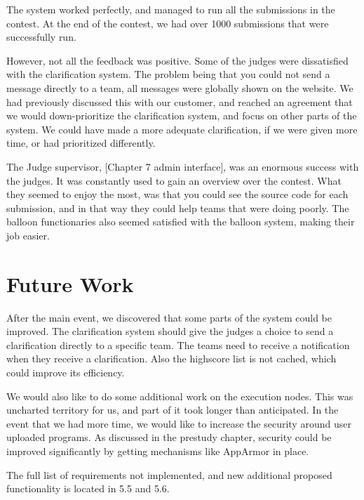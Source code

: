 The system worked perfectly, and managed to run all the submissions in
the contest. At the end of the contest, we had over 1000 submissions
that were successfully run. 

However, not all the feedback was positive. Some of the judges were
dissatisfied with the clarification system. The problem being that you
could not send a message directly to a team, all messages were globally
shown on the website. We had previously discussed this with our
customer, and reached an agreement that we would down-prioritize the
clarification system, and focus on other parts of the system. We could
have made a more adequate clarification, if we were given more time, or
had prioritized differently. 

The Judge supervisor, [Chapter 7 admin interface], was an enormous
success with the judges. It was constantly used to gain an overview
over the contest. What they seemed to enjoy the most, was that you
could see the source code for each submission, and in that way they
could help teams that were doing poorly. The balloon functionaries also
seemed satisfied with the balloon system, making their job easier. \ 

\section{Future Work}

After the main event, we discovered that some parts of the system could
be improved. The clarification system should give the judges a choice
to send a clarification directly to a specific team. The teams need to
receive a notification when they receive a clarification. Also the
highscore list is not cached, which could improve its efficiency.

We would also like to do some additional work on the execution nodes.
This was uncharted territory for us, and part of it took longer than
anticipated. In the event that we had more time, we would like to
increase the security around user uploaded programs. As discussed in
the prestudy chapter, security could be improved significantly by
getting mechanisms like AppArmor in place.

The full list of requirements not implemented, and new additional
proposed functionality is located in 5.5 and 5.6. 

